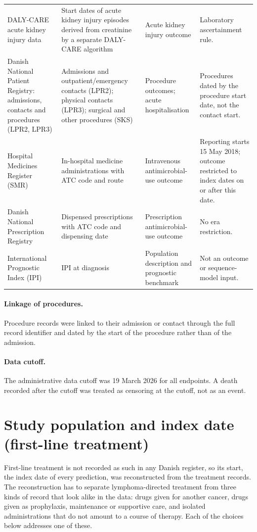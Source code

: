 \documentclass[10pt]{article}
\begin{document}
{\begin{longtable}{L{3.3cm}L{4.3cm}L{4.0cm}L{4.4cm}}
DALY-CARE acute kidney injury data & Start dates of acute kidney injury episodes derived from creatinine by a separate DALY-CARE algorithm & Acute kidney injury outcome & Laboratory ascertainment rule.\\
Danish National Patient Registry: admissions, contacts and procedures (LPR2, LPR3) & Admissions and outpatient/emergency contacts (LPR2); physical contacts (LPR3); surgical and other procedures (SKS) & Procedure outcomes; acute hospitalisation & Procedures dated by the procedure start date, not the contact start.\\
Hospital Medicines Register (SMR) & In-hospital medicine administrations with ATC code and route & Intravenous antimicrobial-use outcome & Reporting starts 15 May 2018; outcome restricted to index dates on or after this date.\\
Danish National Prescription Registry & Dispensed prescriptions with ATC code and dispensing date & Prescription antimicrobial-use outcome & No era restriction.\\
International Prognostic Index (IPI) & IPI at diagnosis & Population description and prognostic benchmark & Not an outcome or sequence-model input.\\
\bottomrule
\end{longtable}}

\paragraph{Linkage of procedures.} Procedure records were linked to their
admission or contact through the full record identifier and dated by the start
of the procedure rather than of the admission.

\paragraph{Data cutoff.} The administrative data cutoff was 19 March 2026 for
all endpoints. A death recorded after the cutoff was treated as censoring at
the cutoff, not as an event.

\section{Study population and index date (first-line treatment)}\label{sec:population}

First-line treatment is not recorded as such in any Danish register, so its
start, the index date of every prediction, was reconstructed from the treatment
records. The reconstruction has to separate lymphoma-directed treatment from
three kinds of record that look alike in the data: drugs given for another
cancer, drugs given as prophylaxis, maintenance or supportive care, and isolated
administrations that do not amount to a course of therapy. Each of the choices
below addresses one of these.
\end{document}
